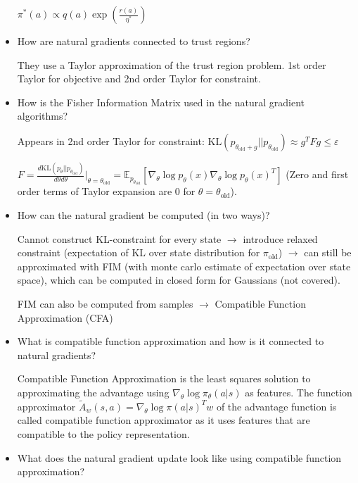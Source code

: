 \documentclass[11pt]{scrartcl}
\begin{document}
\begin{itemize}
    $\pi^*(a) \propto q(a)\exp(\frac{r(a)}{\eta^*})$

    \item How are natural gradients connected to trust regions?
    
    They use a Taylor approximation of the trust region problem.
    1st order Taylor for objective and 2nd order Taylor for constraint.

    \item How is the Fisher Information Matrix used in the natural gradient algorithms?
    
    Appears in 2nd order Taylor for constraint: $\textrm{KL}(p_{\theta_\textrm{old} + g}||p_{\theta_\textrm{old}}) \approx g^T F g \leq \varepsilon$

    $F = \frac{d\textrm{KL}(p_\theta||p_{\theta_\textrm{old}})}{d\theta d\theta}|_{\theta = \theta_\textrm{old}} = 
    \mathbb{E}_{p_{\theta_\textrm{old}}}
    [\nabla_\theta \log p_\theta(x) \nabla_\theta 
    \log p_\theta(x)^T]$
    (Zero and first order terms of Taylor expansion are 0 for 
    $\theta = \theta_\textrm{old}$).

    \item How can the natural gradient be computed (in two ways)?
    
    Cannot construct KL-constraint for every state $\rightarrow$ introduce relaxed constraint (expectation of
    KL over state distribution for $\pi_\mathrm{old}$) $\rightarrow$ can still be approximated with FIM (with monte carlo estimate of expectation over state space), which
    can be computed in closed form for Gaussians (not covered).

    FIM can also be computed from samples $\rightarrow$ Compatible Function Approximation (CFA)

    \item What is compatible function approximation and how is it connected to natural gradients?
    
    Compatible Function Approximation is the least squares solution to approximating the advantage using
    $\nabla_\theta \log \pi_\theta(a|s)$ as features. The function approximator $\tilde{A}_w(s,a) =
    \nabla_\theta \log \pi(a|s)^T w$ of the advantage function is called compatible function approximator
    as it uses features that are compatible to the policy representation.

    \item What does the natural gradient update look like using compatible function approximation?
    

\end{itemize}
\end{document}
